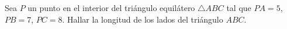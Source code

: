 Sea $P$ un punto en el interior del triángulo equilátero $\triangle ABC$ tal que $PA = 5$, $PB = 7$, $PC = 8$. Hallar la longitud de los lados del triángulo $ABC$.
